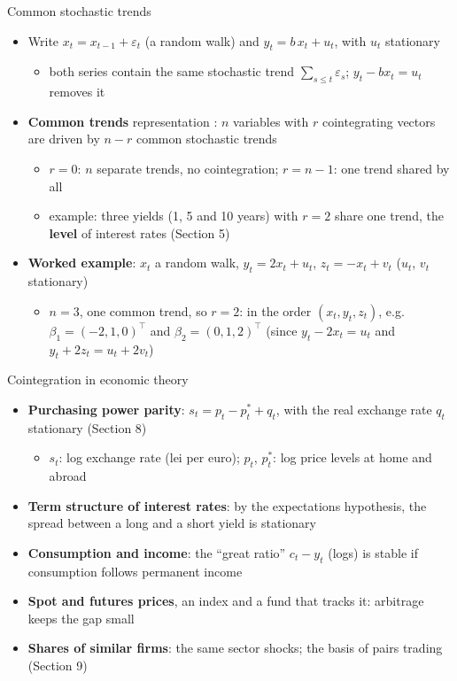 \begin{frame}{Common stochastic trends}
\itemsize{\small}
\begin{itemize}
    \item Write $x_t = x_{t-1} + \varepsilon_t$ (a random walk) and $y_t = b\,x_t + u_t$, with $u_t$ stationary
    \begin{itemize}
        \item both series contain the same stochastic trend $\sum_{s \le t} \varepsilon_s$; $y_t - b x_t = u_t$ removes it
    \end{itemize}
    \item \textbf{Common trends} representation : $n$ variables with $r$ cointegrating vectors are driven by $n - r$ common stochastic trends
    \begin{itemize}
        \item $r = 0$: $n$ separate trends, no cointegration; $r = n - 1$: one trend shared by all
        \item example: three yields (1, 5 and 10 years) with $r = 2$ share one trend, the \textbf{level} of interest rates (Section 5)
    \end{itemize}
    \item \textbf{Worked example}: $x_t$ a random walk, $y_t = 2x_t + u_t$, $z_t = -x_t + v_t$ ($u_t$, $v_t$ stationary)
    \begin{itemize}
        \item $n = 3$, one common trend, so $r = 2$: in the order $(x_t, y_t, z_t)$, e.g.\ $\beta_1 = (-2, 1, 0)^\top$ and $\beta_2 = (0, 1, 2)^\top$ (since $y_t - 2x_t = u_t$ and $y_t + 2z_t = u_t + 2v_t$)
    \end{itemize}
\end{itemize}
\end{frame}

\begin{frame}{Cointegration in economic theory}
\itemsize{\small}
\begin{itemize}
    \item \textbf{Purchasing power parity}: $s_t = p_t - p^*_t + q_t$, with the real exchange rate $q_t$ stationary (Section 8)
    \begin{itemize}
        \item $s_t$: log exchange rate (lei per euro); $p_t$, $p^*_t$: log price levels at home and abroad
    \end{itemize}
    \item \textbf{Term structure of interest rates}: by the expectations hypothesis, the spread between a long and a short yield is stationary 
    \item \textbf{Consumption and income}: the ``great ratio'' $c_t - y_t$ (logs) is stable if consumption follows permanent income
    \item \textbf{Spot and futures prices}, an index and a fund that tracks it: arbitrage keeps the gap small
    \item \textbf{Shares of similar firms}: the same sector shocks; the basis of pairs trading (Section 9)
\end{itemize}
\end{frame}

